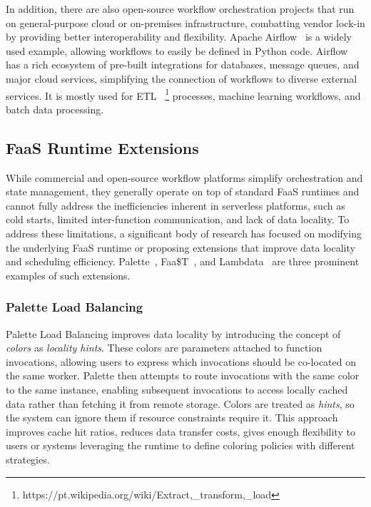 \documentclass[conference]{IEEEtran}
\begin{document}
In addition, there are also open-source workflow orchestration projects that run on general-purpose cloud or on-premises infrastructure, combatting vendor lock-in by providing better interoperability and flexibility. Apache Airflow~\cite{apache_airflow} is a widely used example, allowing workflows to easily be defined in Python code. Airflow has a rich ecosystem of pre-built integrations for databases, message queues, and major cloud services, simplifying the connection of workflows to diverse external services. It is mostly used for ETL ~\footnote{\label{fn:etl}https://pt.wikipedia.org/wiki/Extract,\_transform,\_load} processes, machine learning workflows, and batch data processing.

\subsection{FaaS Runtime Extensions}
While commercial and open-source workflow platforms simplify orchestration and state management, they generally operate on top of standard FaaS runtimes and cannot fully address the inefficiencies inherent in serverless platforms, such as cold starts, limited inter-function communication, and lack of data locality. To address these limitations, a significant body of research has focused on modifying the underlying FaaS runtime or proposing extensions that improve data locality and scheduling efficiency. Palette~\cite{palette_load_balancing}, Faa\$T~\cite{faast_caching}, and Lambdata~\cite{lambdata_intents} are three prominent examples of such extensions.

\subsubsection{Palette Load Balancing}
Palette Load Balancing improves data locality by introducing the concept of \textit{colors} as \textit{locality hints}. These colors are parameters attached to function invocations, allowing users to express which invocations should be co-located on the same worker. Palette then attempts to route invocations with the same color to the same instance, enabling subsequent invocations to access locally cached data rather than fetching it from remote storage. Colors are treated as \textit{hints}, so the system can ignore them if resource constraints require it. This approach improves cache hit ratios, reduces data transfer costs, gives enough flexibility to users or systems leveraging the runtime to define coloring policies with different strategies.
\end{document}
